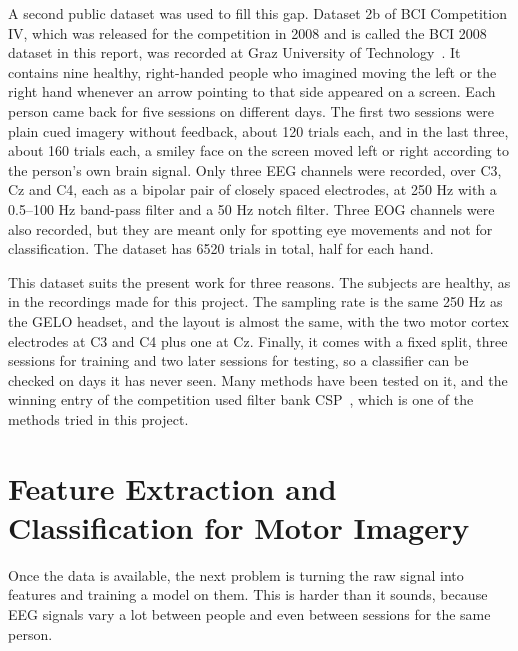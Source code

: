 A second public dataset was used to fill this gap. Dataset 2b of BCI Competition IV, which
was released for the competition in 2008 and is called the BCI 2008 dataset in this report,
was recorded at Graz University of Technology~\cite{leeb2007virtual,
tangermann2012review}. It contains nine healthy, right-handed people who imagined moving
the left or the right hand whenever an arrow pointing to that side appeared on a screen.
Each person came back for five sessions on different days. The first two sessions were
plain cued imagery without feedback, about 120 trials each, and in the last three, about
160 trials each, a smiley face on the screen moved left or right according to the
person's own brain signal. Only three EEG channels were recorded, over C3, Cz and C4, each
as a bipolar pair of closely spaced electrodes, at 250 Hz with a 0.5--100 Hz band-pass
filter and a 50 Hz notch filter. Three EOG channels were also recorded, but they are meant
only for spotting eye movements and not for classification. The dataset has 6520 trials
in total, half for each hand.

This dataset suits the present work for three reasons. The subjects are healthy, as in
the recordings made for this project. The sampling rate is the same 250 Hz as the GELO
headset, and the layout is almost the same, with the two motor cortex electrodes at C3 and
C4 plus one at Cz. Finally, it comes with a fixed split, three sessions for training and
two later sessions for testing, so a classifier can be checked on days it has never seen.
Many methods have been tested on it, and the winning entry of the competition used filter
bank CSP~\cite{ang2012fbcsp}, which is one of the methods tried in this project.

\section{Feature Extraction and Classification for Motor Imagery}

Once the data is available, the next problem is turning the raw signal into features and
training a model on them. This is harder than it sounds, because EEG signals vary a lot
between people and even between sessions for the same person.

